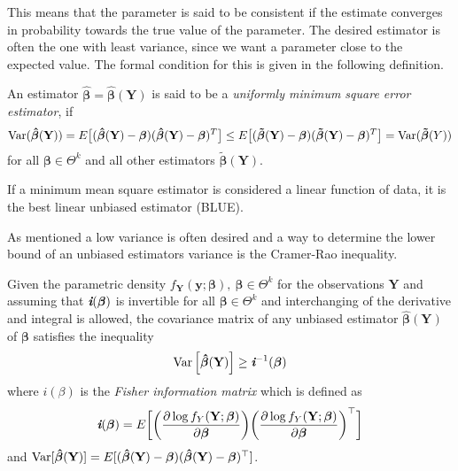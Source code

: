 This means that the parameter is said to be consistent if the estimate converges in probability towards the true value of the parameter. 
The desired estimator is often the one with least variance, since we want a parameter close to the expected value. The formal condition for this is given in the following definition.

\begin{definition} 
\label{def:minimum_mean_square_error}
An estimator $\boldsymbol{\hat{\beta}}=\boldsymbol{\hat{\beta}}(\textbf{Y})$ is said to be a \textit{uniformly minimum square error estimator}, if
\begin{align*}
    \operatorname{\text{Var}}(\boldsymbol{\hat{\beta}}(\textbf{Y})) = E\big[ (\boldsymbol{\hat{\beta}}(\textbf{Y})-\boldsymbol{\beta})(\boldsymbol{\hat{\beta}}(\textbf{Y})-\boldsymbol{\beta})^T \big] \leq E\big[ (\boldsymbol{\tilde{\beta}}(\textbf{Y})-\boldsymbol{\beta})(\boldsymbol{\tilde{\beta}}(\textbf{Y})-\boldsymbol{\beta})^T \big] = \operatorname{\text{Var}}(\boldsymbol{\tilde{\beta}}(Y))
\end{align*} 
for all $\boldsymbol{\beta} \in \Theta^k $ and all other estimators $\boldsymbol{\tilde{\beta}(\textbf{Y})}$.
 \end{definition}
 
If a minimum mean square estimator is considered a linear function of data, it is the best linear unbiased estimator (BLUE).

As mentioned a low variance is often desired and a way to determine the lower bound of an unbiased estimators variance is the Cramer-Rao inequality.
 
 \begin{theorem} 
\label{th:cramerrao_inequality}
Given the parametric density $f_{\textbf{Y}}(\textbf{y};\boldsymbol{\beta}), \ \boldsymbol{\beta} \in \Theta^k$ for the observations $\textbf{Y}$ and assuming that $\textit{\textbf{i}}(\boldsymbol{\beta})$ is invertible for all $\boldsymbol{\beta} \in \Theta^k$ and interchanging of the derivative and integral is allowed, the covariance matrix of any unbiased estimator $\boldsymbol{\hat{\beta}}(\textbf{Y})$ of $\boldsymbol{\beta}$ satisfies the inequality
\begin{align} \label{eq:cramerrao_inequality}
    \operatorname{\text{Var}} \Big[ \boldsymbol{\hat{\beta}}(\textbf{Y})\Big] \geq \textit{\textbf{i}}^{-1}(\boldsymbol{\beta})
\end{align}
where $\textit{i}(\beta)$ is the \textit{Fisher information matrix} which is defined as
\begin{align*}
    \textit{\textbf{i}}(\boldsymbol{\beta})=E \bigg[ \bigg(\frac{\partial \log f_Y(\textbf{Y};\boldsymbol{\beta})}{\partial \boldsymbol{\beta}} \bigg)\bigg(\frac{\partial \log f_Y(\textbf{Y};\boldsymbol{\beta})}{\partial \boldsymbol{\beta}}\bigg)^\top\bigg]
\end{align*}
and $\operatorname{\text{Var}} [\boldsymbol{\hat{\beta}}(\textbf{Y})]=E[(\boldsymbol{\hat{\beta}}(\textbf{Y})-\boldsymbol{\beta})(\boldsymbol{\hat{\beta}}(\textbf{Y})-\boldsymbol{\beta})^\top]$.
\end{theorem}


